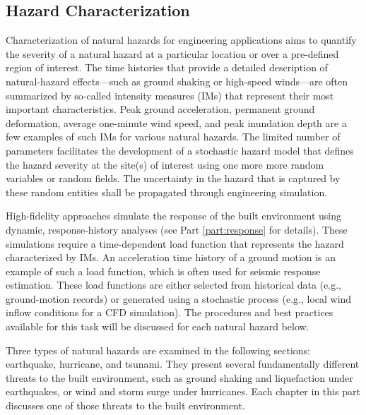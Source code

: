 
\begin{partbacktext}
\part{Hazard Characterization}
\label{part:hazard}

Characterization of natural hazards for engineering applications aims to quantify the severity of a natural hazard at a particular location or over a pre-defined region of interest. The time histories that provide a detailed description of natural-hazard effects---such as ground shaking or high-speed winds---are often summarized by so-called intensity measures (IMs) that represent their most important characteristics. Peak ground acceleration, permanent ground deformation, average one-minute wind speed, and peak inundation depth are a few examples of such IMs for various natural hazards. The limited number of parameters facilitates the development of a stochastic hazard model that defines the hazard severity at the site(s) of interest using one more more random variables or random fields. The uncertainty in the hazard that is captured by these random entities shall be propagated through engineering simulation. 

High-fidelity approaches simulate the response of the built environment using dynamic, response-history analyses (see Part \ref{part:response} for details). These simulations require a time-dependent load function that represents the hazard characterized by IMs. An acceleration time history of a ground motion is an example of such a load function, which is often used for seismic response estimation. These load functions are either selected from historical data (e.g., ground-motion records) or generated using a stochastic process (e.g., local wind inflow conditions for a CFD simulation). The procedures and best practices available for this task will be discussed for each natural hazard below.

Three types of natural hazards are examined in the following sections: earthquake, hurricane, and tsunami. They present several fundamentally different threats to the built environment, such as ground shaking and liquefaction under earthquakes, or wind and storm surge under hurricanes. Each chapter in this part discusses one of those threats to the built environment.

\end{partbacktext}
